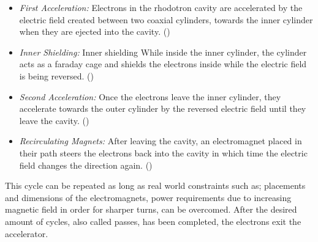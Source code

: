 \documentclass{article}
\begin{document}

\begin{itemize}
    \item \textit{First Acceleration:} Electrons in the rhodotron cavity are accelerated by the electric field created between two coaxial cylinders, towards the inner cylinder when they are ejected into the cavity. ()
    \item \textit{Inner Shielding:} Inner shielding While inside the inner cylinder, the cylinder acts as a faraday cage and shields the electrons inside while the electric field is being reversed. ()
    \item \textit{Second Acceleration:} Once the electrons leave the inner cylinder, they accelerate towards the outer cylinder by the reversed electric field until they leave the cavity. ()
    \item \textit{Recirculating Magnets:} After leaving the cavity, an electromagnet placed in their path steers the electrons back into the cavity in which time the electric field changes the direction again. ()
\end{itemize}

This cycle can be repeated as long as real world constraints such as; placements and dimensions of the electromagnets, power requirements due to increasing magnetic field in order for sharper turns, can be overcomed.
After the desired amount of cycles, also called passes, has been completed, the electrons exit the accelerator.
\end{document}
